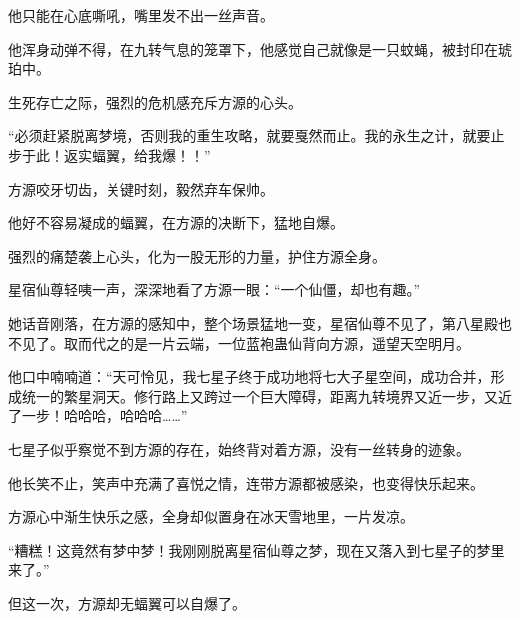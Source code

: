 \begin{this_body}
他只能在心底嘶吼，嘴里发不出一丝声音。

他浑身动弹不得，在九转气息的笼罩下，他感觉自己就像是一只蚊蝇，被封印在琥珀中。

生死存亡之际，强烈的危机感充斥方源的心头。

“必须赶紧脱离梦境，否则我的重生攻略，就要戛然而止。我的永生之计，就要止步于此！返实蝠翼，给我爆！！”

方源咬牙切齿，关键时刻，毅然弃车保帅。

他好不容易凝成的蝠翼，在方源的决断下，猛地自爆。

强烈的痛楚袭上心头，化为一股无形的力量，护住方源全身。

星宿仙尊轻咦一声，深深地看了方源一眼：“一个仙僵，却也有趣。”

她话音刚落，在方源的感知中，整个场景猛地一变，星宿仙尊不见了，第八星殿也不见了。取而代之的是一片云端，一位蓝袍蛊仙背向方源，遥望天空明月。

他口中喃喃道：“天可怜见，我七星子终于成功地将七大子星空间，成功合并，形成统一的繁星洞天。修行路上又跨过一个巨大障碍，距离九转境界又近一步，又近了一步！哈哈哈，哈哈哈……”

七星子似乎察觉不到方源的存在，始终背对着方源，没有一丝转身的迹象。

他长笑不止，笑声中充满了喜悦之情，连带方源都被感染，也变得快乐起来。

方源心中渐生快乐之感，全身却似置身在冰天雪地里，一片发凉。

“糟糕！这竟然有梦中梦！我刚刚脱离星宿仙尊之梦，现在又落入到七星子的梦里来了。”

但这一次，方源却无蝠翼可以自爆了。

\end{this_body}

